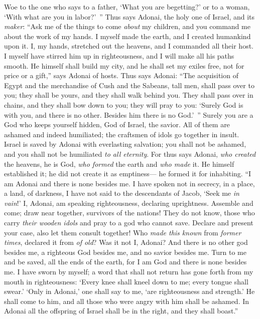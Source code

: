 \begin{biblechapter}
\verse Woe to the one who says to a father, ‘What you are begetting?’ 
or to a woman, ‘With what are you in labor?’ ”
\verse Thus says Adonai, the holy one of Israel, 
and its \textit{maker}: 
“Ask me of the things to come \textit{about} my children, 
and you command me about the work of my hands.
\verse I myself made the earth, 
and I created humankind upon it. 
I, my hands, stretched out the heavens, 
and I commanded all their host.
\verse I myself have stirred him up in righteousness, 
and I will make all his paths smooth. 
He himself shall build my city, 
and he shall set my exiles free, not for price or a gift,” says Adonai of hosts.
 Thus says Adonai: 
“The acquisition of Egypt 
and the merchandise of Cush 
and the Sabeans, tall men, 
shall pass over to you; 
they shall be yours, 
and they shall walk behind you. 
They shall pass over in chains, 
and they shall bow down to you; 
they will pray to you: 
‘Surely God is with you, and there is no other. 
Besides him there is no God.’ ”
\verse Surely you are a God who keeps yourself hidden, 
God of Israel, the savior.
\verse All of them are ashamed and indeed humiliated; 
the craftsmen of idols go together in insult.
\verse Israel is saved by Adonai with everlasting salvation; 
you shall not be ashamed, 
and you shall not be humiliated \textit{to all eternity}.
\verse For thus says Adonai, \textit{who created} the heavens, 
he is God, \textit{who formed} the earth 
and \textit{who made} it. 
He himself established it; 
he did not create it as emptiness— 
he formed it for inhabiting. “I am Adonai and there is none besides me.
\verse I have spoken not in secrecy, in a place, a land, of darkness, 
I have not said to the descendants of Jacob, ‘Seek me \textit{in vain}!’ 
I, Adonai, am speaking righteousness, 
declaring uprightness.
\verse Assemble and come; 
draw near together, survivors of the nations! 
They do not know, those who carry \textit{their wooden idols} 
and pray to a god who cannot save.
\verse Declare and present your case, 
also let them consult together! 
Who \textit{made this known} from \textit{former times}, 
declared it from \textit{of old}? 
Was it not I, Adonai? 
And there is no other god besides me, 
a righteous God besides me, 
and no savior besides me.
\verse Turn to me and be saved, all the ends of the earth, 
for I am God and there is none besides me.
\verse I have sworn by myself; 
a word that shall not return has gone forth from my mouth in righteousness: 
‘Every knee shall kneel down to me; 
every tongue shall swear.’
\verse ‘Only in Adonai,’ one shall say to me, ‘are righteousness and strength.’ 
He shall come to him, and all those who were angry with him shall be ashamed.
\verse In Adonai all the offspring of Israel shall be in the right, 
and they shall boast.”
\end{biblechapter}

